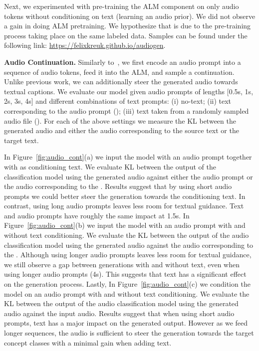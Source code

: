 Next, we experimented with pre-training the \ac{ALM} component on only audio tokens without conditioning on text (learning an audio prior). 
We did not observe a gain in doing \ac{ALM} pretraining. We hypothesize that is due to the pre-training process taking place on the same labeled data. Samples can be found under the following link: \url{https://felixkreuk.github.io/audiogen}.








{\noindent \bf{Audio Continuation.}} Similarly to~\citep{lakhotia2021generative}, we first encode an audio prompt into a sequence of audio tokens, feed it into the \ac{ALM}, and sample a continuation. Unlike previous work, we can additionally steer the generated audio towards textual captions.
We evaluate our model given audio prompts of lengths [0.5s, 1s, 2s, 3s, 4s] and different combinations of text prompts: (i) no-text; (ii) text corresponding to the audio prompt (\src); (iii) text taken from a randomly sampled audio file (\rnd). For each of the above settings we measure the KL between the generated audio and either the audio corresponding to the source text or the target text. 

In Figure~\ref{fig:audio_cont}(a) we input the model with an audio prompt together with \rnd as conditioning text. We evaluate KL between the output of the classification model using the generated audio against either the audio prompt or the audio corresponding to the \rnd. Results suggest that by using short audio prompts we could better steer the generation towards the conditioning text. In contrast, using long audio prompts leaves less room for textual guidance. Text and audio prompts have roughly the same impact at 1.5s. In Figure~\ref{fig:audio_cont}(b) we input the model with an audio prompt with and without \rnd text conditioning. We evaluate the KL between the output of the audio classification model using the generated audio against the audio corresponding to the \rnd. Although using longer audio prompts leaves less room for textual guidance, we still observe a gap between generations with and without text, even when using longer audio prompts (4s). This suggests that text has a significant effect on the generation process. Lastly, In Figure~\ref{fig:audio_cont}(c) we condition the model on an audio prompt with and without \src text conditioning. We evaluate the KL between the output of the audio classification model using the generated audio against the input audio. Results suggest that when using short audio prompts, text has a major impact on the generated output. However as we feed longer sequences, the audio is sufficient to steer the generation towards the target concept classes with a minimal gain when adding text.




